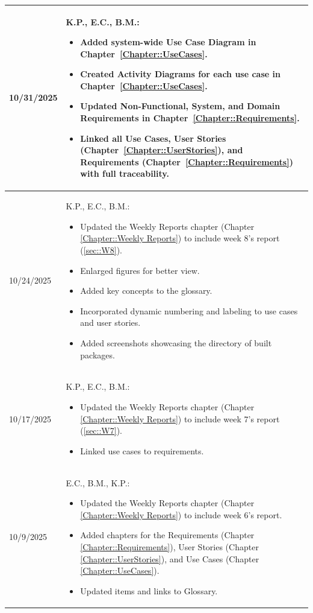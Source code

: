\begin{longtable}{|l||p{13.5cm}|}
10/31/2025 & K.P., E.C., B.M.:
\begin{itemize}[topsep=0pt,itemsep=0pt,parsep=0pt,partopsep=0pt,leftmargin=12pt]
\item Added system-wide Use Case Diagram in Chapter~\ref{Chapter::UseCases}.
\item Created Activity Diagrams for each use case in Chapter~\ref{Chapter::UseCases}.
\item Updated Non-Functional, System, and Domain Requirements in Chapter~\ref{Chapter::Requirements}.
\item Linked all Use Cases, User Stories (Chapter~\ref{Chapter::UserStories}), and Requirements (Chapter~\ref{Chapter::Requirements}) with full traceability.
\end{itemize}
\\ \hline


10/24/2025 & K.P., E.C., B.M.:
\begin{itemize}[topsep=0pt,itemsep=0pt,parsep=0pt,partopsep=0pt,leftmargin=12pt]
\item Updated the Weekly Reports chapter (Chapter \ref{Chapter::Weekly Reports}) to include week 8's report (\ref{sec::W8}).
\item Enlarged figures for better view.
\item Added key concepts to the glossary.
\item Incorporated dynamic numbering and labeling to use cases and user stories.
\item Added screenshots showcasing the directory of built packages.
\end{itemize} 
\\ \hline

10/17/2025 & K.P., E.C., B.M.:
\begin{itemize}[topsep=0pt,itemsep=0pt,parsep=0pt,partopsep=0pt,leftmargin=12pt]
\item Updated the Weekly Reports chapter (Chapter \ref{Chapter::Weekly Reports}) to include week 7's report (\ref{sec::W7}).
\item Linked use cases to requirements.
\end{itemize} 
\\ \hline

10/9/2025 & E.C., B.M., K.P.:
\begin{itemize}[topsep=0pt,itemsep=0pt,parsep=0pt,partopsep=0pt,leftmargin=12pt]
\item Updated the Weekly Reports chapter (Chapter \ref{Chapter::Weekly Reports}) to include week 6's report.
\item Added chapters for the Requirements (Chapter \ref{Chapter::Requirements}), User Stories (Chapter \ref{Chapter::UserStories}), and Use Cases (Chapter \ref{Chapter::UseCases}).
\item Updated items and links to Glossary.
\end{itemize} 
\\ \hline


\end{longtable}
